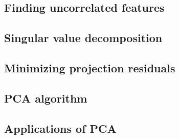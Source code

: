 


\subsection{Finding uncorrelated features}
\label{sub:finding-uncorrelated-features}


\subsection{Singular value decomposition}
\label{sub:singular-value-decomposition}


\subsection{Minimizing projection residuals}
\label{sub:minimizing-projection-residuals}


\subsection{PCA algorithm}


\begin{example}
    \label{eg:pca}
    
\end{example}

\subsection{Applications of PCA}
\label{sub:applications-of-pca}


% 

%     

